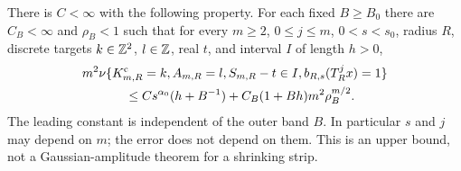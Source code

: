 \begin{theorem}
\label{thm:v48-marked-strip-local}
There is $C<\infty$ with the following property. For each fixed
$B\ge B_0$ there are $C_B<\infty$ and $\rho_B<1$ such that for every
$m\ge2$, $0\le j\le m$, $0<s<s_0$, radius $R$, discrete targets
$k\in\mathbb Z^2$, $l\in\mathbb Z$, real $t$, and interval $I$ of length $h>0$,
\begin{align}
 &m^2\nu\{K^{\rm c}_{m,R}=k,A_{m,R}=l,S_{m,R}-t\in I,
                         b_{R,s}(T_R^jx)=1\}\notag\\
 &\hspace{12mm}\le C s^{\alpha_0}(h+B^{-1})
                  +C_B(1+Bh)m^2\rho_B^{m/2}.
                                      \label{eq:v48-marked-strip-local}
\end{align}
The leading constant is independent of the outer band $B$. In
particular $s$ and $j$ may depend on $m$; the error does not depend
on them. This is an upper bound, not a Gaussian-amplitude theorem
for a shrinking strip.
\end{theorem}
